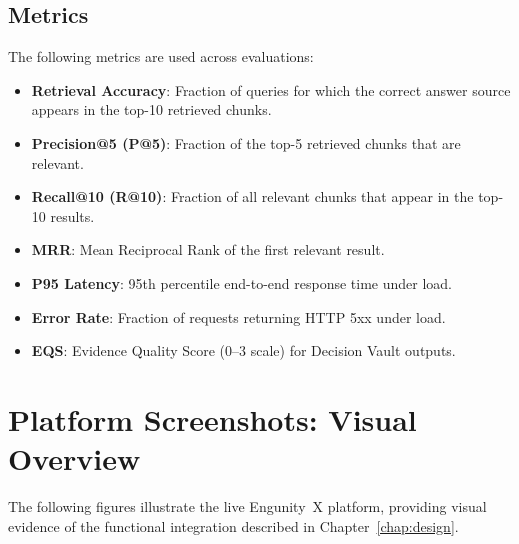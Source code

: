 \subsection{Metrics}
\label{subsec:metrics}

The following metrics are used across evaluations:

\begin{itemize}
    \item \textbf{Retrieval Accuracy}: Fraction of queries for which the correct answer source appears in the top-10 retrieved chunks.
    \item \textbf{Precision@5 (P@5)}: Fraction of the top-5 retrieved chunks that are relevant.
    \item \textbf{Recall@10 (R@10)}: Fraction of all relevant chunks that appear in the top-10 results.
    \item \textbf{MRR}: Mean Reciprocal Rank of the first relevant result.
    \item \textbf{P95 Latency}: 95th percentile end-to-end response time under load.
    \item \textbf{Error Rate}: Fraction of requests returning HTTP 5xx under load.
    \item \textbf{EQS}: Evidence Quality Score (0--3 scale) for Decision Vault outputs.
\end{itemize}

\section{Platform Screenshots: Visual Overview}
\label{sec:visual-overview}

The following figures illustrate the live Engunity~X platform, providing visual evidence of the functional integration described in Chapter~\ref{chap:design}.

